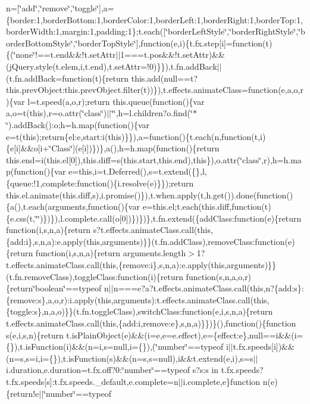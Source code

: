 \begin{DoxyCompactItemize}
n=\mbox{[}\char`\"{}add\char`\"{},\char`\"{}remove\char`\"{},\char`\"{}toggle\char`\"{}\mbox{]},a=\{border\+:1,border\+Bottom\+:1,border\+Color\+:1,border\+Left\+:1,border\+Right\+:1,border\+Top\+:1,border\+Width\+:1,margin\+:1,padding\+:1\};t.\+each(\mbox{[}\char`\"{}border\+Left\+Style\char`\"{},\char`\"{}border\+Right\+Style\char`\"{},\char`\"{}border\+Bottom\+Style\char`\"{},\char`\"{}border\+Top\+Style\char`\"{}\mbox{]},function(e,i)\{t.\+fx.\+step\mbox{[}i\mbox{]}=function(t)\{(\char`\"{}none\char`\"{}!==t.\+end\&\&!t.\+set\+Attr$\vert$$\vert$1===t.\+pos\&\&!t.\+set\+Attr)\&\&(j\+Query.\+style(t.\+elem,i,t.\+end),t.\+set\+Attr=!0)\}\}),t.\+fn.\+add\+Back$\vert$$\vert$(t.\+fn.\+add\+Back=function(t)\{return this.\+add(null==t?this.\+prev\+Object\+:this.\+prev\+Object.\+filter(t))\}),t.\+effects.\+animate\+Class=function(e,a,o,r)\{var l=t.\+speed(a,o,r);return this.\+queue(function()\{var a,o=t(this),r=o.\+attr(\char`\"{}class\char`\"{})$\vert$$\vert$\char`\"{}\char`\"{},h=l.\+children?o.\+find(\char`\"{}$\ast$\char`\"{}).\+add\+Back()\+:o;h=h.\+map(function()\{var e=t(this);return\{el\+:e,start\+:i(this)\}\}),a=function()\{t.\+each(n,function(t,i)\{e\mbox{[}i\mbox{]}\&\&o\mbox{[}i+\char`\"{}\+Class\char`\"{}\mbox{]}(e\mbox{[}i\mbox{]})\})\},a(),h=h.\+map(function()\{return this.\+end=i(this.\+el\mbox{[}0\mbox{]}),this.\+diff=s(this.\+start,this.\+end),this\}),o.\+attr(\char`\"{}class\char`\"{},r),h=h.\+map(function()\{var e=this,i=t.\+Deferred(),s=t.\+extend(\{\},l,\{queue\+:!1,complete\+:function()\{i.\+resolve(e)\}\});return this.\+el.\+animate(this.\+diff,s),i.\+promise()\}),t.\+when.\+apply(t,h.\+get()).\+done(function()\{a(),t.\+each(arguments,function()\{var e=this.\+el;t.\+each(this.\+diff,function(t)\{e.\+css(t,\char`\"{}\char`\"{})\})\}),l.\+complete.\+call(o\mbox{[}0\mbox{]})\})\})\},t.\+fn.\+extend(\{add\+Class\+:function(e)\{return function(i,s,n,a)\{return s?t.\+effects.\+animate\+Class.\+call(this,\{add\+:i\},s,n,a)\+:e.\+apply(this,arguments)\}\}(t.\+fn.\+add\+Class),remove\+Class\+:function(e)\{return function(i,s,n,a)\{return arguments.\+length$>$1?t.\+effects.\+animate\+Class.\+call(this,\{remove\+:i\},s,n,a)\+:e.\+apply(this,arguments)\}\}(t.\+fn.\+remove\+Class),toggle\+Class\+:function(i)\{return function(s,n,a,o,r)\{return\char`\"{}boolean\char`\"{}==typeof n$\vert$$\vert$n===e?a?t.\+effects.\+animate\+Class.\+call(this,n?\{add\+:s\}\+:\{remove\+:s\},a,o,r)\+:i.\+apply(this,arguments)\+:t.\+effects.\+animate\+Class.\+call(this,\{toggle\+:s\},n,a,o)\}\}(t.\+fn.\+toggle\+Class),switch\+Class\+:function(e,i,s,n,a)\{return t.\+effects.\+animate\+Class.\+call(this,\{add\+:i,remove\+:e\},s,n,a)\}\})\}(),function()\{function s(e,i,s,n)\{return t.\+is\+Plain\+Object(e)\&\&(i=e,e=e.\+effect),e=\{effect\+:e\},null==i\&\&(i=\{\}),t.\+is\+Function(i)\&\&(n=i,s=null,i=\{\}),(\char`\"{}number\char`\"{}==typeof i$\vert$$\vert$t.\+fx.\+speeds\mbox{[}i\mbox{]})\&\&(n=s,s=i,i=\{\}),t.\+is\+Function(s)\&\&(n=s,s=null),i\&\&t.\+extend(e,i),s=s$\vert$$\vert$i.\+duration,e.\+duration=t.\+fx.\+off?0\+:\char`\"{}number\char`\"{}==typeof s?s\+:s in t.\+fx.\+speeds?t.\+fx.\+speeds\mbox{[}s\mbox{]}\+:t.\+fx.\+speeds.\+\_\+default,e.\+complete=n$\vert$$\vert$i.\+complete,e\}function n(e)\{return!e$\vert$$\vert$\char`\"{}number\char`\"{}==typeof 
\end{DoxyCompactItemize}
